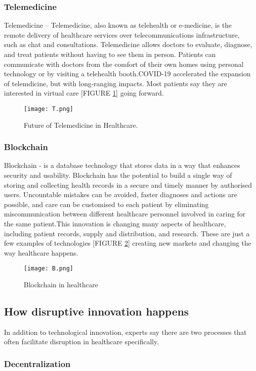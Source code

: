 \documentclass[12pt]{article}
\begin{document}
\subsubsection{Telemedicine  }
Telemedicine – Telemedicine, also known as telehealth or e-medicine, is the remote delivery of healthcare services over telecommunications infrastructure, such as chat and consultations. Telemedicine allows doctors to evaluate, diagnose, and treat patients without having to see them in person. Patients can communicate with doctors from the comfort of their own homes using personal technology or by visiting a telehealth booth.COVID-19 accelerated the expansion of telemdicine, but with long-ranging impacts. Most patients say they are interested in virtual care  [FIGURE \ref{fig_T}]  going forward.
\begin{figure}[h]
\centering
\texttt{[image: T.png]}
\caption{Future of Telemedicine in Healthcare.}
\label{fig_T}
\end{figure}
\clearpage
\subsubsection{Blockchain  } Blockchain - is a database technology that stores data in a way that enhances security and usability. Blockchain has the potential to build a single way of storing and collecting health records in a secure and timely manner by authorised users. Uncountable mistakes can be avoided, faster diagnoses and actions are possible, and care can be customised to each patient by eliminating miscommunication between different healthcare personnel involved in caring for the same patient.This innovation is changing many aspects of healthcare, including patient records, supply and distribution, and research.
These are just a few examples of technologies  [FIGURE \ref{fig_B}]  creating new markets and changing the way healthcare happens.
\begin{figure}[h]
\centering
\texttt{[image: B.png]}
\caption{ Blockchain in healthcare }
\label{fig_B}
\end{figure}
\clearpage
\subsection{How disruptive innovation happens}
In addition to technological innovation, experts say there are two processes that often facilitate disruption in healthcare specifically.

\subsubsection{Decentralization} 
\end{document}
